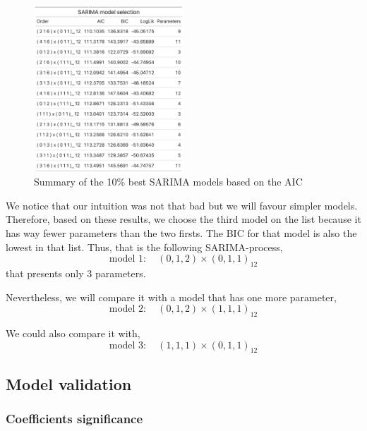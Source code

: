 \begin{figure}[H]
	\centering
	\includegraphics[width=0.5\textwidth]{figures/box_jenkins/sarima_model_selection.png}
	\caption{Summary of the 10\% best SARIMA models based on the AIC}
	\label{fig:sarima-model-selection}
\end{figure}

We notice that our intuition was not that bad but we will favour simpler models. Therefore, based on these results, we choose the third model on the list because it has way fewer parameters than the two firsts. The BIC for that model is also the lowest in that list. Thus, that is the following SARIMA-process,
\begin{equation}
	\text{model 1}: \quad (0, 1, 2) \times (0, 1, 1)_{12}
\end{equation}
that presents only $3$ parameters.

Nevertheless, we will compare it with a model that has one more parameter,
\begin{equation}
	\text{model 2}: \quad (0, 1, 2) \times (1, 1, 1)_{12}
\end{equation}

We could also compare it with, 
\begin{equation}
	\text{model 3}: \quad (1, 1, 1) \times (0, 1, 1)_{12}
\end{equation}

\subsection{Model validation}

\subsubsection{Coefficients significance}

